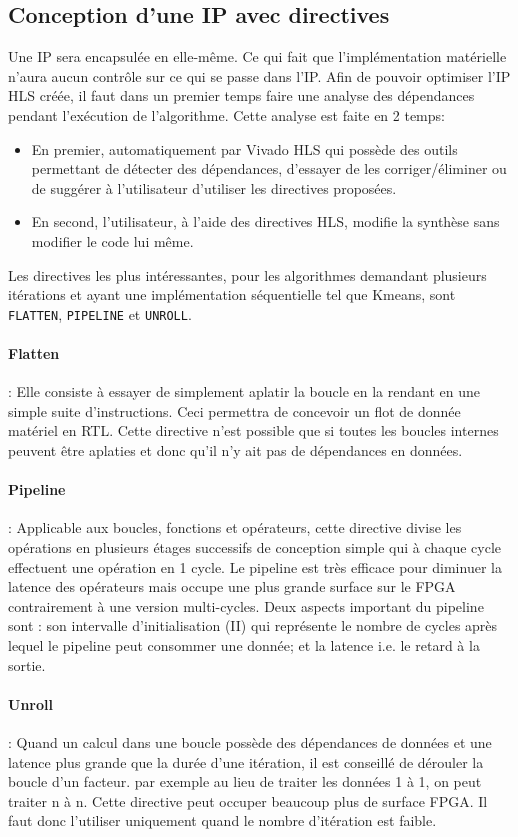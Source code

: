 \documentclass[12pt,a4paper]{ieee}
\begin{document}
\subsection{Conception d'une IP avec directives}
Une IP sera encapsulée en elle-même. Ce qui fait que l'implémentation matérielle n'aura aucun contrôle sur ce qui se passe dans l'IP.
Afin de pouvoir optimiser l'IP HLS créée, il faut dans un premier temps faire une analyse des dépendances pendant l'exécution de l'algorithme. Cette analyse est faite en 2 temps: 
\begin{itemize}
\item En premier, automatiquement par Vivado HLS qui possède des outils permettant de détecter des dépendances, d'essayer de les corriger/éliminer ou de suggérer à l'utilisateur d'utiliser les directives proposées.
\item En second, l'utilisateur, à l'aide des directives HLS, modifie la synthèse sans modifier le code lui même.
\end{itemize}
 Les directives les plus intéressantes, pour les algorithmes demandant plusieurs itérations et ayant une implémentation séquentielle tel que Kmeans, sont \texttt{FLATTEN}, \texttt{PIPELINE} et \texttt{UNROLL}.
 
\paragraph{Flatten} : Elle consiste à essayer de simplement aplatir la boucle en la rendant en une simple suite d'instructions. Ceci permettra de concevoir un flot de donnée matériel en RTL. Cette directive n'est possible que si toutes les boucles internes peuvent être aplaties et donc qu'il n'y ait pas de dépendances en données.
\paragraph{Pipeline} : Applicable aux boucles, fonctions et opérateurs, cette directive divise les opérations en plusieurs étages successifs de conception simple qui à chaque cycle effectuent une opération en 1 cycle. Le pipeline est très efficace pour diminuer la latence des opérateurs mais occupe une plus grande surface sur le FPGA contrairement à une version multi-cycles. Deux aspects important du pipeline sont : son intervalle d'initialisation (II) qui représente le nombre de cycles après lequel le pipeline peut consommer une donnée; et la latence i.e. le retard à la sortie.

\paragraph{Unroll} : Quand un calcul dans une boucle possède des dépendances de données et une latence plus grande que la durée d'une itération, il est conseillé de dérouler la boucle d'un facteur. par exemple au lieu de traiter les données 1 à 1, on peut traiter n à n. Cette directive peut occuper beaucoup plus de surface FPGA. Il faut donc l'utiliser uniquement quand le nombre d'itération est faible.
\end{document}
